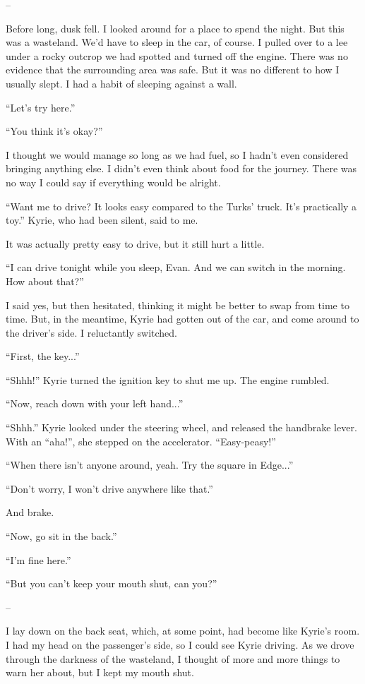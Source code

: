 \documentclass[oneside]{book}
\begin{document}
–

Before long, dusk fell. I looked around for a place to spend the night. But this was a wasteland. We’d have to sleep in the car, of course. I pulled over to a lee under a rocky outcrop we had spotted and turned off the engine. There was no evidence that the surrounding area was safe. But it was no different to how I usually slept. I had a habit of sleeping against a wall.

“Let’s try here.”

“You think it’s okay?”

I thought we would manage so long as we had fuel, so I hadn’t even considered bringing anything else. I didn’t even think about food for the journey. There was no way I could say if everything would be alright.

“Want me to drive? It looks easy compared to the Turks’ truck. It’s practically a toy.” Kyrie, who had been silent, said to me.

It was actually pretty easy to drive, but it still hurt a little.

“I can drive tonight while you sleep, Evan. And we can switch in the morning. How about that?”

I said yes, but then hesitated, thinking it might be better to swap from time to time. But, in the meantime, Kyrie had gotten out of the car, and come around to the driver’s side. I reluctantly switched.

“First, the key...”

“Shhh!” Kyrie turned the ignition key to shut me up. The engine rumbled.

“Now, reach down with your left hand...”

“Shhh.” Kyrie looked under the steering wheel, and released the handbrake lever. With an “aha!”, she stepped on the accelerator. “Easy-peasy!”

“When there isn’t anyone around, yeah. Try the square in Edge...”

“Don’t worry, I won’t drive anywhere like that.”

And brake.

“Now, go sit in the back.”

“I’m fine here.”

“But you can’t keep your mouth shut, can you?”

–

I lay down on the back seat, which, at some point, had become like Kyrie’s room. I had my head on the passenger’s side, so I could see Kyrie driving. As we drove through the darkness of the wasteland, I thought of more and more things to warn her about, but I kept my mouth shut.
\end{document}
